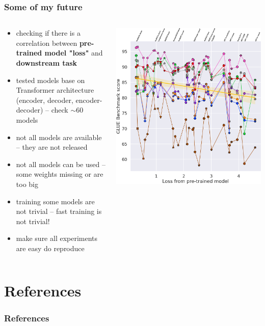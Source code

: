 \documentclass{beamer}
\begin{document}
\begin{frame}
    \frametitle{Some of my future}
    \begin{columns}
    \begin{column}{0.5\textwidth}
    \footnotesize
    \begin{itemize}
        \item checking if there is a correlation between \textbf{pre-trained model "loss"} and \textbf{downstream task}
        \item tested models base on Transformer architecture (encoder, decoder, encoder-decoder) -- check $\sim$60 models
        \item not all models are available -- they are not released
        \item not all models can be used -- some weights missing or are too big
        \item training some models are not trivial -- fast training is not trivial!
        \item make sure all experiments are easy do reproduce
    \end{itemize}
    \end{column}
    \begin{column}{0.5\textwidth}
    \includegraphics[scale=0.2]{img/kk-plot-loss.png}
    \end{column}
    \end{columns}
\end{frame}


\section{References}
\begin{frame}[allowframebreaks,t]
    \tiny
    \frametitle{References}
    
    
\end{frame}
\end{document}
